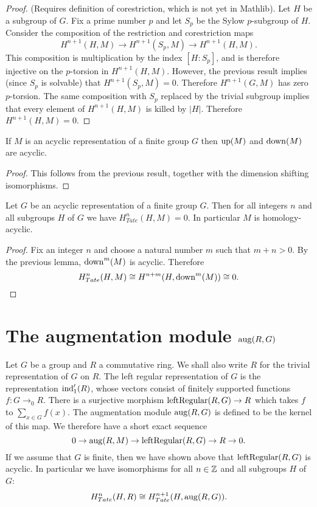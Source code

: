\begin{proof}
	(Requires definition of corestriction, which is not yet in Mathlib).
	Let $H$ be a subgroup of $G$.
	Fix a prime number $p$ and let $S_p$ be the Sylow $p$-subgroup of $H$.
	Consider the composition of the restriction and corestriction maps
	\[
		H^{n+1}(H,M) \to H^{n+1}(S_p,M) \to H^{n+1}(H,M).
	\]
	This composition is multiplication by the index $[H:S_p]$,
	and is therefore injective on the $p$-torsion
	in $H^{n+1}(H,M)$.
	However, the previous result implies (since $S_p$ is solvable) that $H^{n+1}(S_p,M)=0$.
	Therefore $H^{n+1}(G,M)$ has zero $p$-torsion.
	The same composition with $S_p$ replaced by the trivial subgroup implies that every element
	of $H^{n+1}(H,M)$ is killed by $|H|$.
	Therefore $H^{n+1}(H,M) = 0$.
\end{proof}


\begin{corollary}
	If $M$ is an acyclic representation of a finite group $G$
	then $\mathrm{up}(M)$ and $\mathrm{down}(M)$ are acyclic.
\end{corollary}

\begin{proof}
	This follows from the previous result, together with the dimension shifting isomorphisms.
\end{proof}

\begin{theorem}
	Let $G$ be an acyclic representation of a finite group $G$.
	Then for all integers $n$ and all subgroups $H$ of $G$ we have $H^n_{Tate}(H,M)=0$.
	In particular $M$ is homology-acyclic.
\end{theorem}

\begin{proof}
	Fix an integer $n$ and choose a natural number $m$ such that $m + n > 0$.
	By the previous lemma, $\mathrm{down}^m(M)$ is acyclic.
	Therefore
	\[
		H^n_{Tate}(H,M) \cong H^{n+m}(H, \mathrm{down}^m(M)) \cong 0.
	\]
\end{proof}



\section{The augmentation module $\mathrm{aug}(R,G)$}

Let $G$ be a group and $R$ a commutative ring. We shall also write $R$ for the trivial
representation of $G$ on $R$.
The left regular representation of $G$ is the representation $\mathrm{ind}_1'(R)$, whose
vectors consist of finitely supported functions $f : G \to_0 R$.
There is a surjective morphism $\mathrm{leftRegular}(R,G) \to R$ which takes $f$ to $\sum_{x \in G} f(x)$.
The augmentation module $\mathrm{aug}(R,G)$ is defined to be the kernel of this map.
We therefore have a short exact sequence
\[
	0 \to \mathrm{aug}(R,M) \to \mathrm{leftRegular}(R,G) \to R \to 0.
\]
If we assume that $G$ is finite, then we have shown above that $\mathrm{leftRegular}(R,G)$ is acyclic.
In particular we have isomorphisms for all $n \in {\mathbb Z}$ and all subgroups $H$ of $G$:
\[
	H^n_{Tate}(H,R) \cong H^{n+1}_{Tate}(H,\mathrm{aug}(R,G)).
\]


